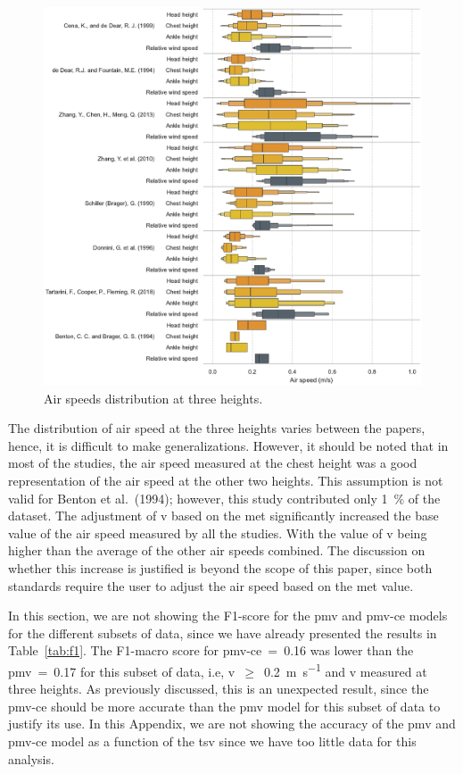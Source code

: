 \begin{figure}[htb!]
    \centering
    \includegraphics[width=\textwidth]{figures/boxenplot_wind_speed_three_heights}
    \caption{Air speeds distribution at three heights.}
    \label{fig:boxenplot_wind_speed_three_heights}
\end{figure}
The distribution of air speed at the three heights varies between the papers, hence, it is difficult to make generalizations.
However, it should be noted that in most of the studies, the air speed measured at the chest height was a good representation of the air speed at the other two heights.
This assumption is not valid for Benton et al.\ (1994); however, this study contributed only \qty{1}{\percent} of the dataset.
The adjustment of \ac{v} based on the \ac{met} significantly increased the base value of the air speed measured by all the studies.
With the value of \ac{v} being  higher than the average of the other air speeds combined.
The discussion on whether this increase is justified is beyond the scope of this paper, since both standards require the user to adjust the air speed based on the \ac{met} value.

In this section, we are not showing the F1-score for the \ac{pmv} and \ac{pmv-ce} models for the different subsets of data, since we have already presented the results in Table~\ref{tab:f1}.
The F1-macro score for \ac{pmv-ce}~=~\num{.16} was lower than the \ac{pmv}~=~\num{.17} for this subset of data, i.e, \ac{v}~$\geq$~\qty{0.2}{\m\per\s} and \ac{v} measured at three heights.
As previously discussed, this is an unexpected result, since the \ac{pmv-ce} should be more accurate than the \ac{pmv} model for this subset of data to justify its use.
In this Appendix, we are not showing the accuracy of the \ac{pmv} and \ac{pmv-ce} model as a function of the \ac{tsv} since we have too little data for this analysis.

